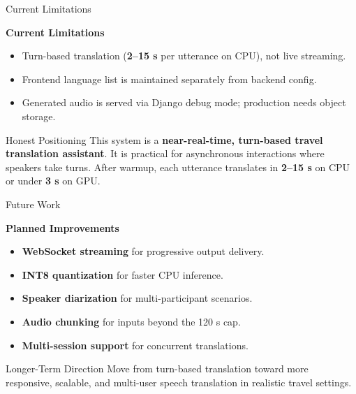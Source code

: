 \documentclass{beamer}
\begin{document}
\begin{frame}[t]{Current Limitations}
\small

\textbf{Current Limitations}
\begin{itemize}\setlength{\itemsep}{4pt}
    \item Turn-based translation (\textbf{2--15 s} per utterance on CPU), not live streaming.
    \item Frontend language list is maintained separately from backend config.
    \item Generated audio is served via Django debug mode; production needs object storage.
\end{itemize}

\vspace{6pt}
\begin{block}{Honest Positioning}
This system is a \textbf{near-real-time, turn-based travel translation assistant}.
It is practical for asynchronous interactions where speakers take turns.
After warmup, each utterance translates in \textbf{2--15 s} on CPU or under
\textbf{3 s} on GPU.
\end{block}

\end{frame}

\begin{frame}[t]{Future Work}
\small

\textbf{Planned Improvements}
\begin{itemize}\setlength{\itemsep}{5pt}
    \item \textbf{WebSocket streaming} for progressive output delivery.
    \item \textbf{INT8 quantization} for faster CPU inference.
    \item \textbf{Speaker diarization} for multi-participant scenarios.
    \item \textbf{Audio chunking} for inputs beyond the 120 s cap.
    \item \textbf{Multi-session support} for concurrent translations.
\end{itemize}

\vspace{6pt}
\begin{block}{Longer-Term Direction}
Move from turn-based translation toward more responsive, scalable, and
multi-user speech translation in realistic travel settings.
\end{block}

\end{frame}
\end{document}
